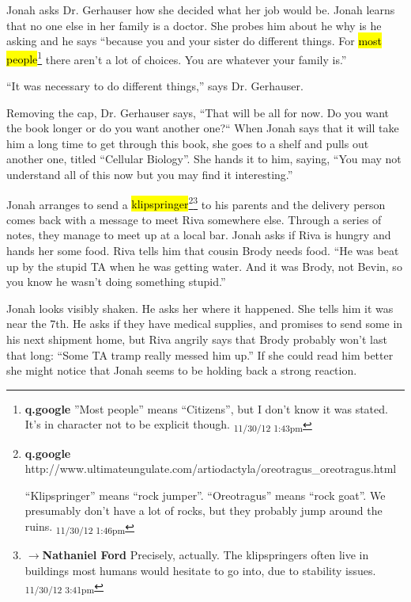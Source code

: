 Jonah asks Dr. Gerhauser how she decided what her job would be.  Jonah learns that no one else in her family is a doctor.  She probes him about he why is he asking and he says ``because you and your sister do different things.  For \hl{most people}\footnote{\textbf{q.google }''Most people'' means ``Citizens'', but I don't know it was stated.  It's in character not to be explicit though. \textsubscript{11/30/12 1:43pm}} there aren't a lot of choices.  You are whatever your family is.''

``It was necessary to do different things,'' says Dr. Gerhauser.



Removing the cap, Dr. Gerhauser says, ``That will be all for now.  Do you want the book longer or do you want another one?``  When Jonah says that it will take him a long time to get through this book, she goes to a shelf and pulls out another one, titled ``Cellular Biology''.  She hands it to him, saying, ``You may not understand all of this now but you may find it interesting.''




Jonah arranges to send a \hl{klipspringer}\footnote{\textbf{q.google }http://www.ultimateungulate.com/artiodactyla/oreotragus\_oreotragus.html

``Klipspringer'' means ``rock jumper''.  ``Oreotragus'' means ``rock goat''.  We presumably don't have a lot of rocks, but they probably jump around the ruins. \textsubscript{11/30/12 1:46pm}}\footnote{$\rightarrow$\textbf{Nathaniel Ford }Precisely, actually. The klipspringers often live in buildings most humans would hesitate to go into, due to stability issues. \textsubscript{11/30/12 3:41pm}} to his parents and the delivery person comes back with a message to meet Riva somewhere else.  Through a series of notes, they manage to meet up at a local bar.  Jonah asks if Riva is hungry and hands her some food.  Riva tells him that cousin Brody needs food. ``He was beat up by the stupid TA when he was getting water.  And it was Brody, not Bevin, so you know he wasn't doing something stupid.''



Jonah looks visibly shaken.  He asks her where it happened.  She tells him it was near the 7th.  He asks if they have medical supplies, and promises to send some in his next shipment home, but Riva angrily says that Brody probably won't last that long: ``Some TA tramp really messed him up.''  If she could read him better she might notice that Jonah seems to be holding back a strong reaction.



